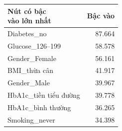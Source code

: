 \begin{tabular}{lr}
\toprule
\makecell[l]{Nút có bậc\\vào lớn nhất} & Bậc vào \\
\midrule
Diabetes\_no & 87{.}664 \\
Glucose\_126–199 & 58{.}578 \\
Gender\_Female & 56{.}161 \\
BMI\_thừa cân & 41{.}917 \\
Gender\_Male & 39{.}967 \\
HbA1c\_tiền tiểu đường & 39{.}778 \\
HbA1c\_bình thường & 36{.}265 \\
Smoking\_never & 34{.}398 \\
\bottomrule
\end{tabular}
